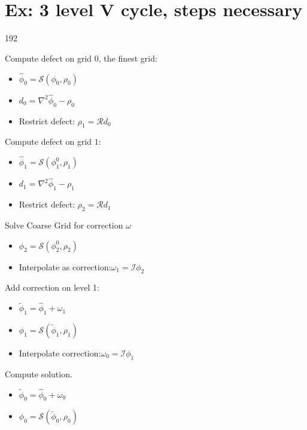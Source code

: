 \section{Ex: 3 level V cycle, steps necessary}
	\label{sec:EX_V_Ccyles}
\begin{dingautolist}{192}
			\item Compute defect on grid \(0\), the finest grid:
		\begin{itemize}
			\item	\( \widehat{\phi}_0 = \mathcal{S}(\phi_0, \rho_0)\)
			\item 	\(d_0 = \nabla^2\widehat{\phi}_0 - \rho_0\)
			\item Restrict defect: \(\rho_1 = \mathcal{R}d_0 \) \nonumber
		\end{itemize}
	\item Compute defect on grid \(1\):
		\begin{itemize}
			\item \(\widehat{\phi}_1 = \mathcal{S}(\phi_1^0, \rho_1)\)
			\item \(d_1 = \nabla^2\widehat{\phi}_1 - \rho_1 \)
			\item Restrict defect: \(\rho_2 = \mathcal{R}d_1 \)
		\end{itemize}
	\item Solve Coarse Grid for correction \(\omega\)
		\begin{itemize}
			\item \( \phi_2 = \mathcal{S}(\phi_2^0, \rho_2)\)
			\item Interpolate as correction:\(\omega_1 = \mathcal{I}\phi_2\)
		\end{itemize}
	\item Add correction on level 1:
		\begin{itemize}
			\item \(\widetilde{\phi}_1 = \widehat{\phi}_1 + \omega_1\)
			\item \( \phi_1 = \mathcal{S}(\widetilde{\phi}_1, \rho_1)  \)
			\item Interpolate correction:\( \omega_0 = \mathcal{I} \phi_1\)
		\end{itemize}
	\item Compute solution.
		\begin{itemize}
			\item \(\widetilde{\phi}_0 = \widehat{\phi}_0 + \omega_0\)
			\item \( \phi_0 = \mathcal{S}(\widetilde{\phi}_0, \rho_0)  \)
		\end{itemize}
\end{dingautolist}
